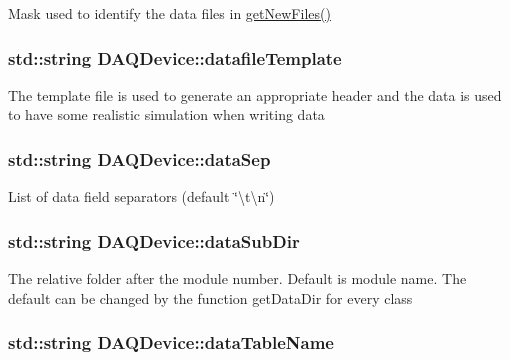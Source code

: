 Mask used to identify the data files in \hyperlink{classDAQDevice_a8d52a03c722baf86c7279478f31f6e60}{get\-New\-Files()} \hypertarget{classDAQDevice_a551a005ad3f98c83a2b8b38bc3634007}{
\subsubsection[{datafile\-Template}]{\setlength{\rightskip}{0pt plus 5cm}std\-::string D\-A\-Q\-Device\-::datafile\-Template\hspace{0.3cm}{\ttfamily [protected]}}}\label{classDAQDevice_a551a005ad3f98c83a2b8b38bc3634007}
The template file is used to generate an appropriate header and the data is used to have some realistic simulation when writing data \hypertarget{classDAQDevice_ae8e11658c72f3a6468cc37f1e8cf08bb}{
\subsubsection[{data\-Sep}]{\setlength{\rightskip}{0pt plus 5cm}std\-::string D\-A\-Q\-Device\-::data\-Sep\hspace{0.3cm}{\ttfamily [protected]}}}\label{classDAQDevice_ae8e11658c72f3a6468cc37f1e8cf08bb}
List of data field separators (default \char`\"{}\textbackslash{}t\textbackslash{}n\char`\"{}) \hypertarget{classDAQDevice_a8adec9c21ffa22beee97e2eda1f2488c}{
\subsubsection[{data\-Sub\-Dir}]{\setlength{\rightskip}{0pt plus 5cm}std\-::string D\-A\-Q\-Device\-::data\-Sub\-Dir\hspace{0.3cm}{\ttfamily [protected]}}}\label{classDAQDevice_a8adec9c21ffa22beee97e2eda1f2488c}
The relative folder after the module number. Default is module name. The default can be changed by the function get\-Data\-Dir for every class \hypertarget{classDAQDevice_a3b932e09b546454324cc07d7958f58ac}{
\subsubsection[{data\-Table\-Name}]{\setlength{\rightskip}{0pt plus 5cm}std\-::string D\-A\-Q\-Device\-::data\-Table\-Name\hspace{0.3cm}{\ttfamily [protected]}}}\label{classDAQDevice_a3b932e09b546454324cc07d7958f58ac}
